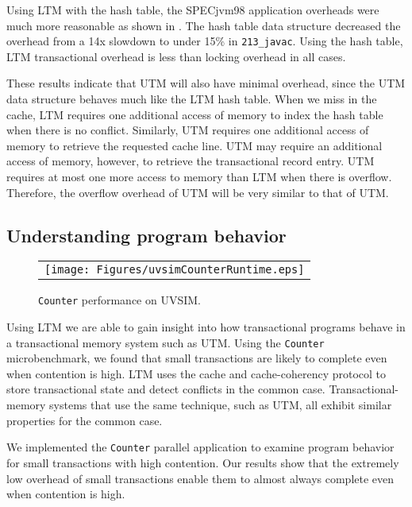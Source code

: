 Using LTM with the hash table, the SPECjvm98 application overheads
were much more reasonable as shown in .  The hash
table data structure decreased the overhead from a 14x slowdown to
under 15\% in \texttt{213\_javac}. Using the hash table, LTM
transactional overhead is less than locking overhead in all cases.

These results indicate that UTM will also have minimal overhead, since
the UTM data structure behaves much like the LTM hash table. When we
miss in the cache, LTM requires one additional access of memory to
index the hash table when there is no conflict. Similarly, UTM
requires one additional access of memory to retrieve the requested
cache line.  UTM may require an additional access of memory, however,
to retrieve the transactional record entry. UTM requires at most one
more access to memory than LTM when there is overflow.  Therefore, the
overflow overhead of UTM will be very similar to that of UTM.

\subsection{Understanding program behavior}

\begin{figure}
\begin{center}
\begin{tabular}{c}
\texttt{[image: Figures/uvsimCounterRuntime.eps]}
\end{tabular}
\end{center}
\caption{\texttt{Counter} performance on UVSIM.}
\label{fig:microbenchperf}
\end{figure}

Using LTM we are able to gain insight into how transactional programs
behave in a transactional memory system such as UTM. Using the
\texttt{Counter} microbenchmark, we found that small transactions are
likely to complete even when contention is high. LTM uses the
cache and cache-coherency protocol to store transactional state and
detect conflicts in the common case. Transactional-memory systems that
use the same technique, such as UTM, all exhibit similar
properties for the common case.

We implemented the \texttt{Counter} parallel application to examine
program behavior for small transactions with high contention. Our
results show that the extremely low overhead of small transactions
enable them to almost always complete even when contention is high.

